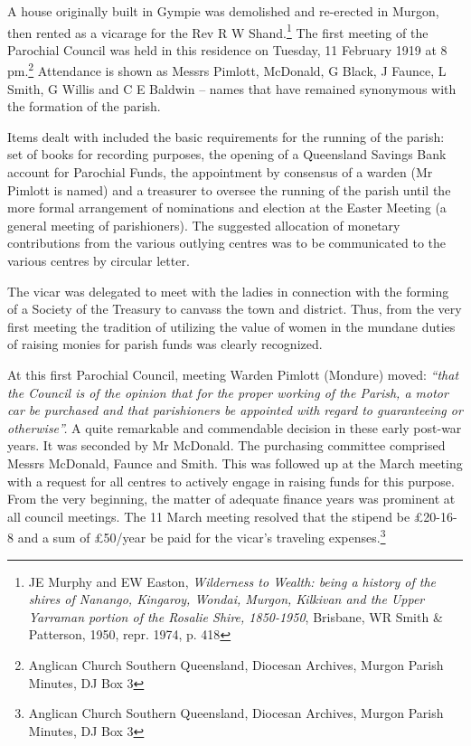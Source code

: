 A house originally built in Gympie was demolished and re-erected in Murgon, then rented as a vicarage for the Rev R W Shand.\footnote{JE Murphy and EW Easton, \emph{Wilderness to Wealth: being a history of the shires of Nanango, Kingaroy, Wondai, Murgon, Kilkivan and the Upper Yarraman portion of the Rosalie Shire, 1850-1950}, Brisbane, WR Smith \& Patterson, 1950, repr. 1974, p. 418} The first meeting of the Parochial Council was held in this residence on Tuesday, 11 February 1919 at 8 pm.\footnote{Anglican Church Southern Queensland, Diocesan Archives, Murgon Parish Minutes, DJ Box 3} Attendance is shown as Messrs Pimlott, McDonald, G Black, J Faunce, L Smith, G Willis and C E Baldwin -- names that have remained synonymous with the formation of the parish.


Items dealt with included the basic requirements for the running of the parish: set of books for recording purposes, the opening of a Queensland Savings Bank account for Parochial Funds, the appointment by consensus of a warden (Mr Pimlott is named) and a treasurer to oversee the running of the parish until the more formal arrangement of nominations and election at the Easter Meeting (a general meeting of parishioners). The suggested allocation of monetary contributions from the various outlying centres was to be communicated to the various centres by circular letter.



The vicar was delegated to meet with the ladies in connection with the forming of a Society of the Treasury to canvass the town and district. Thus, from the very first meeting the tradition of utilizing the value of women in the mundane duties of raising monies for parish funds was clearly recognized.



At this first Parochial Council, meeting Warden Pimlott (Mondure) moved: \emph{``that the Council is of the opinion that for the proper working of the Parish, a motor car be purchased and that parishioners be appointed with regard to guaranteeing or otherwise''.} A quite remarkable and commendable decision in these early post-war years. It was seconded by Mr McDonald. The purchasing committee comprised Messrs McDonald, Faunce and Smith. This was followed up at the March meeting with a request for all centres to actively engage in raising funds for this purpose. From the very beginning, the matter of adequate finance years was prominent at all council meetings. The 11 March meeting resolved that the stipend be \pounds20-16-8 and a sum of \pounds50/year be paid for the vicar's traveling expenses.\footnote{Anglican Church Southern Queensland, Diocesan Archives, Murgon Parish Minutes, DJ Box 3}


